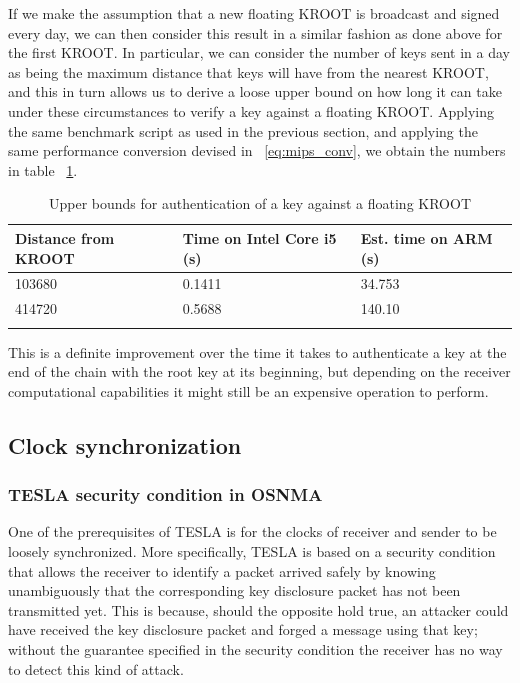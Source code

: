 If we make the assumption that a new floating KROOT is broadcast and signed
every day, we can then consider this result in a similar fashion as done above
for the first KROOT. In particular, we can consider the number of keys sent in a
day as being the maximum distance that keys will have from the nearest KROOT,
and this in turn allows us to derive a loose upper bound on how long it can take
under these circumstances to verify a key against a floating KROOT. Applying the
same benchmark script as used in the previous section, and applying the same
performance conversion devised in ~\ref{eq:mips_conv}, we obtain the numbers in
table ~\ref{table:float_kroot}.

\begin{longtable}[]{@{}lll@{}}
\toprule
  Distance from KROOT & Time on Intel Core i5 (s) & Est. time on ARM (s)
  \tabularnewline
\midrule
\endhead
  103680 & 0.1411 & 34.753 \tabularnewline
  414720 & 0.5688 & 140.10 \tabularnewline
\bottomrule
  \caption{Upper bounds for authentication of a key against a floating KROOT}
\label{table:float_kroot}
\end{longtable}

This is a definite improvement over the time it takes to authenticate a key at
the end of the chain with the root key at its beginning, but depending on the
receiver computational capabilities it might still be an expensive operation to
perform.


\subsection{Clock synchronization}

\subsubsection{TESLA security condition in OSNMA}

One of the prerequisites of TESLA is for the clocks of receiver and sender to be
loosely synchronized. More specifically, TESLA is based on a security condition
that allows the receiver to identify a packet arrived safely by knowing
unambiguously that the corresponding key disclosure packet has not been
transmitted yet. This is because, should the opposite hold true, an attacker
could have received the key disclosure packet and forged a message using that
key; without the guarantee specified in the security condition the receiver has
no way to detect this kind of attack.

